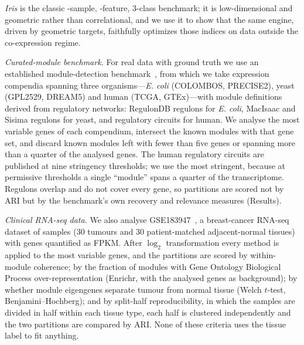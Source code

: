 \emph{Iris} \cite{Fisher1936} is the classic \IrisSamples{}-sample,
\IrisFeatures{}-feature, 3-class benchmark; it is low-dimensional and geometric
rather than correlational, and we use it to show that the same engine, driven by
geometric targets, faithfully optimizes those indices on data outside the
co-expression regime.

\emph{Curated-module benchmark.} For real data with ground truth we use an established module-detection benchmark~\cite{Saelens2018}, from which we take \SaelensNDatasets{} expression compendia spanning three organisms---\emph{E. coli} (COLOMBOS, PRECISE2), yeast (GPL2529, DREAM5) and human (TCGA, GTEx)---with module definitions derived from regulatory networks: RegulonDB regulons for \emph{E. coli}, MacIsaac and Sisima regulons for yeast, and regulatory circuits for human. We analyse the \SaelensNTop{} most variable genes of each compendium, intersect the known modules with that gene set, and discard known modules left with fewer than five genes or spanning more than a quarter of the analysed genes. The human regulatory circuits are published at nine stringency thresholds; we use the most stringent, because at permissive thresholds a single ``module'' spans a quarter of the transcriptome. Regulons overlap and do not cover every gene, so partitions are scored not by ARI but by the benchmark's own recovery and relevance measures (Results).

\emph{Clinical RNA-seq data.} We also analyse GSE183947~\cite{Zhang2021}, a breast-cancer RNA-seq dataset of \EmpSamples{} samples (30 tumours and 30 patient-matched adjacent-normal tissues) with \EmpFullGenes{} genes quantified as FPKM. After $\log_2$ transformation every method is applied to the \EmpCompNTop{} most variable genes, and the partitions are scored by within-module coherence; by the fraction of modules with Gene Ontology Biological Process over-representation (Enrichr, with the analysed genes as background); by whether module eigengenes separate tumour from normal tissue (Welch $t$-test, Benjamini--Hochberg); and by split-half reproducibility, in which the samples are divided in half within each tissue type, each half is clustered independently and the two partitions are compared by ARI. None of these criteria uses the tissue label to fit anything.

